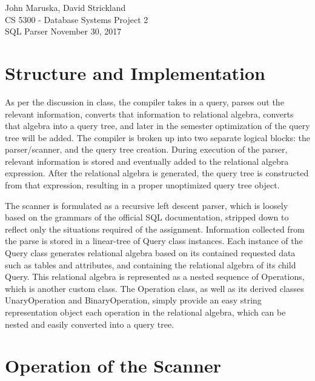 \documentclass[]{article}
\begin{document}
	\noindent John Maruska, David Strickland \\
	CS 5300 - Database Systems \hfill Project 2 \\
	SQL Parser \hfill November 30, 2017
	
	\noindent\hrulefill 
	\doublespacing

	\section{Structure and Implementation}
	
	
	
	As per the discussion in class, the compiler takes in a query, parses out the relevant information, converts that information to relational algebra, converts that algebra into a query tree, and later in the semester optimization of the query tree will be added. The compiler is broken up into two separate logical blocks: the parser/scanner, and the query tree creation. During execution of the parser, relevant information is stored and eventually added to the relational algebra expression. After the relational algebra is generated, the query tree is constructed from that expression, resulting in a proper unoptimized query tree object.
	
	The scanner is formulated as a recursive left descent parser, which is loosely based on the grammars of the official SQL documentation, stripped down to reflect only the situations required of the assignment. Information collected from the parse is stored in a linear-tree of Query class instances. Each instance of the Query class generates relational algebra based on its contained requested data such as tables and attributes, and containing the relational algebra of its child Query. This relational algebra is represented as a nested sequence of Operations, which is another custom class. The Operation class, as well as its derived classes UnaryOperation and BinaryOperation, simply provide an easy string representation object each operation in the relational algebra, which can be nested and easily converted into a query tree. 

	
	\section{Operation of the Scanner}
	
\end{document}
